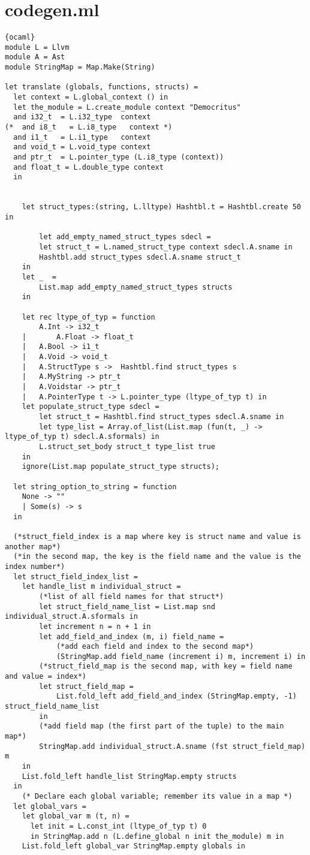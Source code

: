 \section{codegen.ml}
\begin{lstlisting}{ocaml}
module L = Llvm
module A = Ast
module StringMap = Map.Make(String)

let translate (globals, functions, structs) =
  let context = L.global_context () in
  let the_module = L.create_module context "Democritus"
  and i32_t  = L.i32_type  context
(*  and i8_t   = L.i8_type   context *)
  and i1_t   = L.i1_type   context
  and void_t = L.void_type context
  and ptr_t  = L.pointer_type (L.i8_type (context)) 
  and float_t = L.double_type context
  in
		

	let struct_types:(string, L.lltype) Hashtbl.t = Hashtbl.create 50 in

        let add_empty_named_struct_types sdecl =
		let struct_t = L.named_struct_type context sdecl.A.sname in
		Hashtbl.add struct_types sdecl.A.sname struct_t
	in
	let _  =
		List.map add_empty_named_struct_types structs 
	in

	let rec ltype_of_typ = function
		A.Int -> i32_t
	|       A.Float -> float_t
	| 	A.Bool -> i1_t
 	|	A.Void -> void_t
	| 	A.StructType s ->  Hashtbl.find struct_types s
	|	A.MyString -> ptr_t 
	| 	A.Voidstar -> ptr_t 
	|	A.PointerType t -> L.pointer_type (ltype_of_typ t) in 
	let populate_struct_type sdecl = 
		let struct_t = Hashtbl.find struct_types sdecl.A.sname in
		let type_list = Array.of_list(List.map (fun(t, _) -> ltype_of_typ t) sdecl.A.sformals) in
		L.struct_set_body struct_t type_list true
	in 
    ignore(List.map populate_struct_type structs);
  
  let string_option_to_string = function
	None -> ""
	| Some(s) -> s
  in
	
  (*struct_field_index is a map where key is struct name and value is another map*)
  (*in the second map, the key is the field name and the value is the index number*)
  let struct_field_index_list =
	let handle_list m individual_struct = 
		(*list of all field names for that struct*) 
		let struct_field_name_list = List.map snd individual_struct.A.sformals in
		let increment n = n + 1 in
		let add_field_and_index (m, i) field_name =
			(*add each field and index to the second map*)
			(StringMap.add field_name (increment i) m, increment i) in
		(*struct_field_map is the second map, with key = field name and value = index*)
		let struct_field_map = 
			List.fold_left add_field_and_index (StringMap.empty, -1) struct_field_name_list
		in
		(*add field map (the first part of the tuple) to the main map*)
		StringMap.add individual_struct.A.sname (fst struct_field_map) m	
	in
	List.fold_left handle_list StringMap.empty structs	
  in
    (* Declare each global variable; remember its value in a map *)
  let global_vars =
    let global_var m (t, n) =
      let init = L.const_int (ltype_of_typ t) 0
      in StringMap.add n (L.define_global n init the_module) m in
    List.fold_left global_var StringMap.empty globals in


\end{lstlisting}
